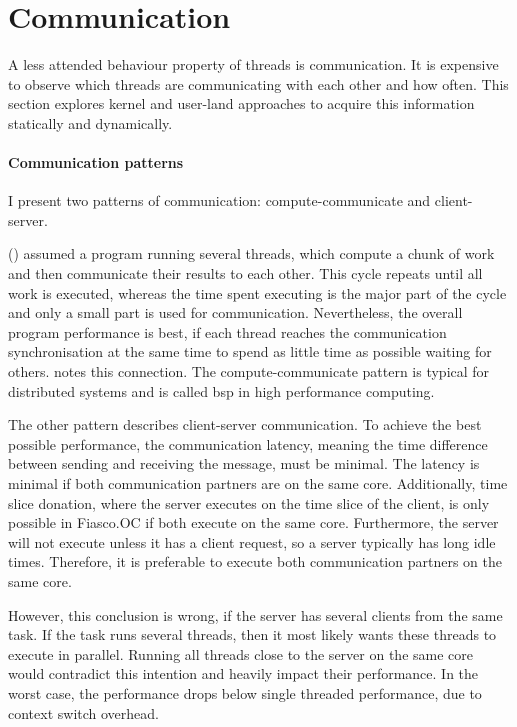 \section{Communication}
\label{design:comm}


A less attended behaviour property of threads is communication.
It is expensive to observe which threads are communicating with each other and
how often.
This section explores kernel and user-land approaches to acquire this
information statically and dynamically.


\paragraph{Communication patterns}
I present two patterns of communication: compute-communicate and client-server.

\citeauthor{hofmeyr_load_2010} (\cite{hofmeyr_load_2010}) assumed a program running several threads, which
compute a chunk of work and then communicate their results to each other.
This cycle repeats until all work is executed, whereas the time spent executing
is the major part of the cycle and only a small part is used for communication.
Nevertheless, the overall program performance is best, if each thread reaches
the communication synchronisation at the same time to spend as little time as
possible waiting for others.
\cite{hofmeyr_load_2010} notes this connection.
The compute-communicate pattern is typical for distributed systems and is
called \gls{bsp} in high performance computing.

The other pattern describes client-server communication.
To achieve the best possible performance, the communication latency, meaning
the time difference between sending and receiving the message, must be minimal.
The latency is minimal if both communication partners are on the same core.
Additionally, time slice donation, where the server executes on the time slice
of the client, is only possible in Fiasco.OC if both execute on the same core.
Furthermore, the server will not execute unless it has a client request, so a
server typically has long idle times.
Therefore, it is preferable to execute both communication partners on the same
core.

However, this conclusion is wrong, if the server has several clients from the
same task.
If the task runs several threads, then it most likely wants these threads to
execute in parallel.
Running all threads close to the server on the same core would contradict this
intention and heavily impact their performance.
In the worst case, the performance drops below single threaded performance, due
to context switch overhead.

